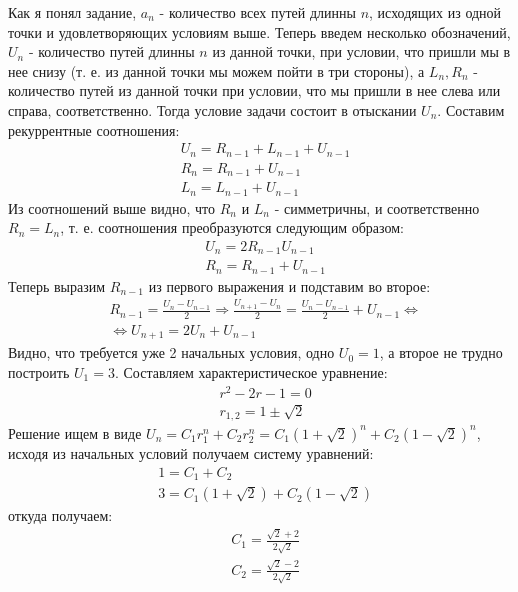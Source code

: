 \documentclass[a4paper,12pt]{article}
\begin{document}
\begin{Solution}
Как я понял задание, $a_n$ - количество всех путей длинны $n$, исходящих из одной точки и удовлетворяющих условиям выше. Теперь введем несколько обозначений, $U_n$ - количество путей длинны $n$ из данной точки, при условии, что пришли мы в нее снизу (т. е. из данной точки мы можем пойти в три стороны), а $L_n,R_n$ - количество путей из данной точки при условии, что мы пришли в нее слева или справа, соответственно. Тогда условие задачи состоит в отыскании $U_n$. Составим рекуррентные соотношения:
\[
	\begin{split}
		& U_n = R_{n-1} + L_{n-1} + U_{n-1} \\
		& R_n = R_{n-1} + U_{n-1} \\
		& L_n = L_{n-1} + U_{n-1}
	\end{split}
\]
Из соотношений выше видно, что $R_n$ и $L_n$ - симметричны, и соответственно $R_n = L_n$, т. е. соотношения преобразуются следующим образом:
\[
	\begin{split}
		& U_n = 2 R_{n-1} U_{n-1} \\
		& R_n = R_{n-1} + U_{n-1}
	\end{split}
\]
Теперь выразим $R_{n-1}$ из первого выражения и подставим во второе:
\[
	\begin{split}
		& R_{n-1} = \frac{U_n - U_{n-1}}{2} \Rightarrow \frac{U_{n+1} - U_n}{2} = \frac{U_n - U_{n-1}}{2} + U_{n-1} \Leftrightarrow \\
		& \Leftrightarrow U_{n+1} = 2 U_n + U_{n-1}
	\end{split}
\]
Видно, что требуется уже 2 начальных условия, одно $U_0 = 1$, а второе не трудно построить $U_1 = 3$.
Составляем характеристическое уравнение:
\[
	\begin{split}
		& r^2 - 2 r - 1 = 0 \\
		& r_{1,2} = 1 \pm \sqrt{2}
	\end{split}
\]
Решение ищем в виде $U_n = C_1 r_1^n + C_2 r_2^n = C_1 {\left(1+\sqrt{2}\right)}^n + C_2 {\left(1 - \sqrt{2}\right)}^n$, исходя из начальных условий получаем систему уравнений:
\[
	\begin{split}
		& 1 = C_1 + C_2 \\
		& 3 = C_1 \left(1 + \sqrt{2}\right) + C_2 \left(1 - \sqrt{2}\right)
	\end{split}
\]
откуда получаем:
\[
	\begin{split}
		& C_1 = \frac{\sqrt{2} + 2}{2\sqrt{2}} \\
		& C_2 = \frac{\sqrt{2} - 2}{2 \sqrt{2}}
	\end{split}
\]
\end{Solution}
\end{document}
